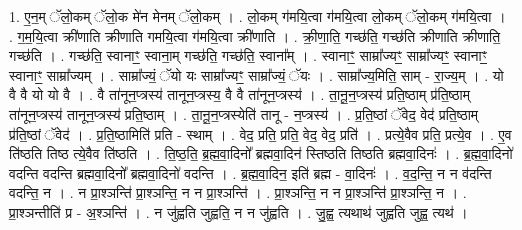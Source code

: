 \documentclass[17pt]{extarticle}
\begin{document}
1. ए॒न॒म् ॅलो॒कम् ॅलो॒क मे॑न मेनम् ॅलो॒कम् । . लो॒कम् ग॑मयि॒त्वा ग॑मयि॒त्वा लो॒कम् ॅलो॒कम् ग॑मयि॒त्वा । . ग॒म॒यि॒त्वा क्री॑णाति क्रीणाति गमयि॒त्वा ग॑मयि॒त्वा क्री॑णाति । . क्री॒णा॒ति॒ गच्छ॑ति॒ गच्छ॑ति क्रीणाति क्रीणाति॒ गच्छ॑ति । . गच्छ॑ति॒ स्वानाꣳ॒॒ स्वाना॒म् गच्छ॑ति॒ गच्छ॑ति॒ स्वाना᳚म् । . स्वानाꣳ॒॒ साम्रा᳚ज्यꣳ॒॒ साम्रा᳚ज्यꣳ॒॒ स्वानाꣳ॒॒ स्वानाꣳ॒॒ साम्रा᳚ज्यम् । . साम्रा᳚ज्यं॒ ॅयो यः साम्रा᳚ज्यꣳ॒॒ साम्रा᳚ज्यं॒ ॅयः । . साम्रा᳚ज्य॒मिति॒ साम् - रा॒ज्य॒म् । . यो वै वै यो यो वै । . वै ता॑नून॒प्त्रस्य॑ तानून॒प्त्रस्य॒ वै वै ता॑नून॒प्त्रस्य॑ । . ता॒नू॒न॒प्त्रस्य॑ प्रति॒ष्ठाम् प्र॑ति॒ष्ठाम् ता॑नून॒प्त्रस्य॑ तानून॒प्त्रस्य॑ प्रति॒ष्ठाम् । . ता॒नू॒न॒प्त्रस्येति॑ तानू - न॒प्त्रस्य॑ । . प्र॒ति॒ष्ठां ॅवेद॒ वेद॑ प्रति॒ष्ठाम् प्र॑ति॒ष्ठां ॅवेद॑ । . प्र॒ति॒ष्ठामिति॑ प्रति - स्थाम् । . वेद॒ प्रति॒ प्रति॒ वेद॒ वेद॒ प्रति॑ । . प्रत्ये॒वैव प्रति॒ प्रत्ये॒व । . ए॒व ति॑ष्ठति तिष्ठ त्ये॒वैव ति॑ष्ठति । . ति॒ष्ठ॒ति॒ ब्र॒ह्म॒वा॒दिनो᳚ ब्रह्मवा॒दिन॑ स्तिष्ठति तिष्ठति ब्रह्मवा॒दिनः॑ । . ब्र॒ह्म॒वा॒दिनो॑ वदन्ति वदन्ति ब्रह्मवा॒दिनो᳚ ब्रह्मवा॒दिनो॑ वदन्ति । . ब्र॒ह्म॒वा॒दिन॒ इति॑ ब्रह्म - वा॒दिनः॑ । . व॒द॒न्ति॒ न न व॑दन्ति वदन्ति॒ न । . न प्रा॒श्ञन्ति॑ प्रा॒श्ञन्ति॒ न न प्रा॒श्ञन्ति॑ । . प्रा॒श्ञन्ति॒ न न प्रा॒श्ञन्ति॑ प्रा॒श्ञन्ति॒ न । . प्रा॒श्ञन्तीति॑ प्र - अ॒श्ञन्ति॑ । . न जु॑ह्वति जुह्वति॒ न न जु॑ह्वति । . जु॒ह्व॒ त्यथाथ॑ जुह्वति जुह्व॒ त्यथ॑ । \newline
\end{document}
